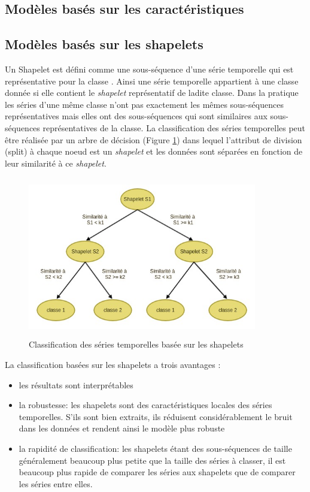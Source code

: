 \subsection{Modèles basés sur les caractéristiques}\label{sec:feature_based_model}

\subsection{Modèles basés sur les shapelets}\label{sec:shapelet_based_model}
Un Shapelet est défini comme une sous-séquence d'une série temporelle qui est représentative pour la classe \citep{ye2009time}. Ainsi une série temporelle appartient à une classe donnée si elle contient le \textit{shapelet} représentatif de ladite classe. Dans la pratique les séries d'une même classe n'ont pas exactement les mêmes sous-séquences représentatives mais elles ont des sous-séquences qui sont similaires aux sous-séquences représentatives de la classe. 
La classification des séries temporelles peut être réalisée par un arbre de décision (Figure \ref{fig:shapelet_based_dt}) dans lequel l'attribut de division (split) à chaque noeud est un \textit{shapelet} et les données sont séparées en fonction de leur similarité à ce \textit{shapelet}.

\begin{figure}[!h]
    \centering
    \includegraphics[width=10cm,height=7cm]{report/figures/shapelet-based-tree.jpg}
    \caption{Classification des séries temporelles basée sur les shapelets}
    \label{fig:shapelet_based_dt}
\end{figure}

La classification basées sur les shapelets a trois avantages \citep{ye2009time}:
\begin{itemize}
    \item les résultats sont interprétables 
    \item la robustesse: les shapelets sont des caractéristiques locales des séries temporelles. S'ils sont bien extraits, ils réduisent considérablement le bruit dans les données et rendent ainsi le modèle plus robuste
    \item la rapidité de classification: les shapelets étant des sous-séquences de taille généralement beaucoup plus petite que la taille des séries à classer, il est beaucoup plus rapide de comparer les séries aux shapelets que de comparer les séries entre elles.
\end{itemize}

